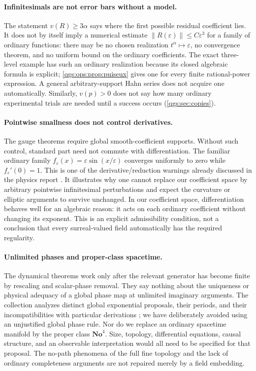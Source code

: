 \documentclass[11pt,oneside]{article}
\numberwithin{equation}{section}
\theoremstyle{plain}
\theoremstyle{definition}
\theoremstyle{remark}
\newcommand{\No}{\mathbf{No}}
\newcommand{\norm}[1]{\left\|#1\right\|}
\begin{document}
\paragraph{Infinitesimals are not error bars without a model.}
The statement $v(R)\ge3\alpha$ says where the first possible residual coefficient lies. It does not by itself imply a numerical estimate $\norm{R(\varepsilon)}\le C\varepsilon^3$ for a family of ordinary functions: there may be no chosen realization $t^\alpha\mapsto\varepsilon$, no convergence theorem, and no uniform bound on the ordinary coefficients. The exact three-level example has such an ordinary realization because its closed algebraic formula is explicit; \cref{qgs:ops:prop:puiseux} gives one for every finite rational-power expression. A general arbitrary-support Hahn series does not acquire one automatically. Similarly, $v(p)>0$ does not say how many ordinary experimental trials are needed until a success occurs (\cref{qgs:sec:copies}).

\paragraph{Pointwise smallness does not control derivatives.}
The gauge theorems require global smooth-coefficient supports. Without such control, standard part need not commute with differentiation. The familiar ordinary family $f_\varepsilon(x)=\varepsilon\sin(x/\varepsilon)$ converges uniformly to zero while $f_\varepsilon'(0)=1$. This is one of the derivative/reduction warnings already discussed in the physics report \cite{repoPhysics}. It illustrates why one cannot replace our coefficient space by arbitrary pointwise infinitesimal perturbations and expect the curvature or elliptic arguments to survive unchanged. In our coefficient space, differentiation behaves well for an algebraic reason: it acts on each ordinary coefficient without changing its exponent. This is an explicit admissibility condition, not a conclusion that every surreal-valued field automatically has the required regularity.

\paragraph{Unlimited phases and proper-class spacetime.}
The dynamical theorems work only after the relevant generator has become finite by rescaling and scalar-phase removal. They say nothing about the uniqueness or physical adequacy of a global phase map at unlimited imaginary arguments. The collection analyzes distinct global exponential proposals, their periods, and their incompatibilities with particular derivations \cite{repoPhysics,repoQuaternion}; we have deliberately avoided using an unjustified global phase rule. Nor do we replace an ordinary spacetime manifold by the proper class $\No^4$. Size, topology, differential equations, causal structure, and an observable interpretation would all need to be specified for that proposal. The no-path phenomena of the full fine topology and the lack of ordinary completeness arguments are not repaired merely by a field embedding.
\end{document}
